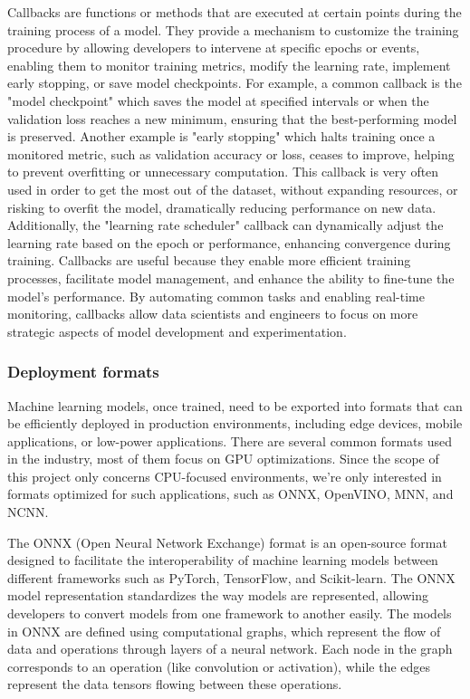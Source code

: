 \documentclass[12pt]{article}
\begin{document}
Callbacks are functions or methods that are executed at certain points during the training process of a model. They provide a mechanism to customize the training procedure by allowing developers to intervene at specific epochs or events, enabling them to monitor training metrics, modify the learning rate, implement early stopping, or save model checkpoints. For example, a common callback is the "model checkpoint" which saves the model at specified intervals or when the validation loss reaches a new minimum, ensuring that the best-performing model is preserved. Another example is "early stopping" which halts training once a monitored metric, such as validation accuracy or loss, ceases to improve, helping to prevent overfitting or unnecessary computation. This callback is very often used in order to get the most out of the dataset, without expanding resources, or risking to overfit the model, dramatically reducing performance on new data.
Additionally, the "learning rate scheduler" callback can dynamically adjust the learning rate based on the epoch or performance, enhancing convergence during training. Callbacks are useful because they enable more efficient training processes, facilitate model management, and enhance the ability to fine-tune the model's performance. By automating common tasks and enabling real-time monitoring, callbacks allow data scientists and engineers to focus on more strategic aspects of model development and experimentation.

\subsubsection{Deployment formats}
Machine learning models, once trained, need to be exported into formats that can be efficiently deployed in production environments, including edge devices, mobile applications, or low-power applications. There are several common formats used in the industry, most of them focus on GPU optimizations. Since the scope of this project only concerns CPU-focused environments, we're only interested in formats optimized for such applications, such as ONNX, OpenVINO, MNN, and NCNN.

The ONNX (Open Neural Network Exchange) format is an open-source format designed to facilitate the interoperability of machine learning models between different frameworks such as PyTorch, TensorFlow, and Scikit-learn. The ONNX model representation standardizes the way models are represented, allowing developers to convert models from one framework to another easily. The models in ONNX are defined using computational graphs, which represent the flow of data and operations through layers of a neural network. Each node in the graph corresponds to an operation (like convolution or activation), while the edges represent the data tensors flowing between these operations.
\end{document}
